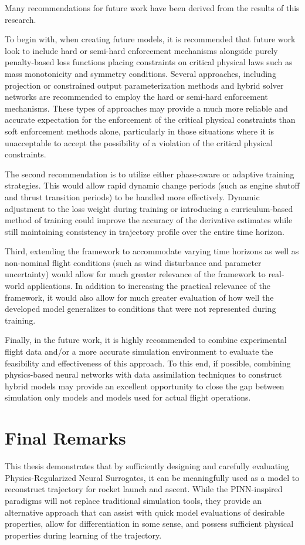 Many recommendations for future work have been derived from the results of this research.

To begin with, when creating future models, it is recommended that future work look to include 
hard or semi-hard enforcement mechanisms alongside purely penalty-based loss functions placing 
constraints on critical physical laws such as mass monotonicity and symmetry conditions. Several 
approaches, including projection or constrained output parameterization methods and hybrid solver 
networks are recommended to employ the hard or semi-hard enforcement mechanisms. These types of 
approaches may provide a much more reliable and accurate expectation for the enforcement of the 
critical physical constraints than soft enforcement methods alone, particularly in those situations 
where it is unacceptable to accept the possibility of a violation of the critical physical constraints.

The second recommendation is to utilize either phase-aware or adaptive training strategies. This would 
allow rapid dynamic change periods (such as engine shutoff and thrust transition periods) to be handled 
more effectively. Dynamic adjustment to the loss weight during training or introducing a curriculum-based 
method of training could improve the accuracy of the derivative estimates while still maintaining consistency 
in trajectory profile over the entire time horizon.

Third, extending the framework to accommodate varying time horizons as well as non-nominal flight conditions 
(such as wind disturbance and parameter uncertainty) would allow for much greater relevance of the framework 
to real-world applications. In addition to increasing the practical relevance of the framework, it would also 
allow for much greater evaluation of how well the developed model generalizes to conditions that were not represented 
during training.

Finally, in the future work, it is highly recommended to combine experimental flight data and/or a more accurate 
simulation environment to evaluate the feasibility and effectiveness of this approach. To this end, if possible, 
combining physics-based neural networks with data assimilation techniques to construct hybrid models may provide 
an excellent opportunity to close the gap between simulation only models and models used for actual flight operations.

\section{Final Remarks}
This thesis demonstrates that by sufficiently designing and carefully evaluating Physics-Regularized Neural Surrogates, 
it can be meaningfully used as a model to reconstruct trajectory for rocket launch and ascent. While the PINN-inspired 
paradigms will not replace traditional simulation tools, they provide an alternative approach that can assist with quick 
model evaluations of desirable properties, allow for differentiation in some sense, 
and possess sufficient physical properties during learning of the trajectory.

